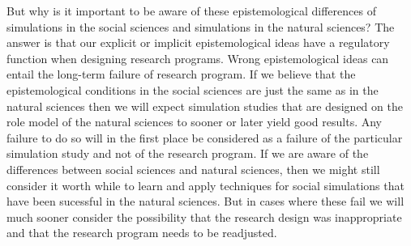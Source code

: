 \documentclass[onecollarge]{STJour}
\numberwithin{equation}{section}
\begin{document}
But why is it important to be aware of these epistemological differences
of simulations in the social sciences and simulations in the natural
sciences? The answer is that our explicit or implicit epistemological
ideas have a regulatory function when designing research programs. Wrong
epistemological ideas can entail the long-term failure of research
program. If we believe that the epistemological conditions in the social
sciences are just the same as in the natural sciences then we will expect
simulation studies that are designed on the role model of the natural
sciences to sooner or later yield good results. Any failure to do so will
in the first place be considered as a failure of the particular
simulation study and not of the research program. If we are aware of the
differences between social sciences and natural sciences, then we might
still consider it worth while to learn and apply techniques for social
simulations that have been sucessful in the natural sciences. But in
cases where these fail we will much sooner consider the possibility that
the research design was inappropriate and that the research program needs
to be readjusted.
\end{document}
